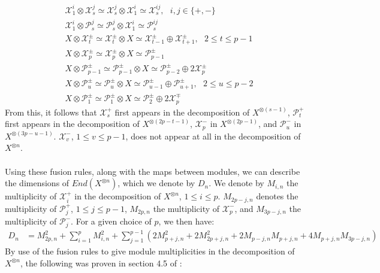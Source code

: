 \documentclass[]{article}
\begin{document}
\begin{align*}
&\mathcal{X}^{i}_{1}\otimes\mathcal{X}^{j}_{s}\simeq\mathcal{X}^{j}_{s}\otimes\mathcal{X}^{i}_{1}\simeq\mathcal{X}^{ij}_{s}, \:\:\: i,j\in\{+,-\}\\
&\mathcal{X}^{i}_{1}\otimes\mathcal{P}^{j}_{s}\simeq\mathcal{P}^{j}_{s}\otimes\mathcal{X}^{i}_{1}\simeq\mathcal{P}^{ij}_{s}\\
& X\otimes\mathcal{X}^{\pm}_{t}\simeq\mathcal{X}^{\pm}_{t}\otimes X\simeq\mathcal{X}^{\pm}_{t-1}\oplus\mathcal{X}^{\pm}_{t+1}, \:\:\: 2\leq t\leq p-1\\
& X\otimes\mathcal{X}^{\pm}_{p}\simeq \mathcal{X}^{\pm}_{p}\otimes X\simeq \mathcal{P}^{\pm}_{p-1}\\
& X\otimes\mathcal{P}^{\pm}_{p-1}\simeq \mathcal{P}^{\pm}_{p-1}\otimes X\simeq \mathcal{P}^{\pm}_{p-2}\oplus 2\mathcal{X}^{\pm}_{p}\\
& X\otimes\mathcal{P}^{\pm}_{u}\simeq\mathcal{P}^{\pm}_{u}\otimes X\simeq\mathcal{P}^{\pm}_{u-1}\oplus\mathcal{P}^{\pm}_{u+1}, \:\:\: 2\leq u\leq p-2\\
& X\otimes\mathcal{P}^{\pm}_{1}\simeq\mathcal{P}^{\pm}_{1}\otimes X\simeq\mathcal{P}^{\pm}_{2}\oplus 2\mathcal{X}^{\mp}_{p}
\end{align*}
From this, it follows that $\mathcal{X}^{+}_{s}$ first appears in the decomposition of $X^{\otimes (s-1)}$, $\mathcal{P}^{+}_{t}$ first appears in the decomposition of $X^{\otimes(2p-t-1)}$, $\mathcal{X}^{-}_{p}$ in $X^{\otimes(2p-1)}$, and $\mathcal{P}^{-}_{u}$ in $X^{\otimes(3p-u-1)}$. $\mathcal{X}^{-}_{v}$, $1\leq v\leq p-1$, does not appear at all in the decomposition of $X^{\otimes n}$.\\
\\
Using these fusion rules, along with the maps between modules, we can describe the dimensions of $End(X^{\otimes n})$, which we denote by $D_{n}$. We denote by $M_{i,n}$ the multiplicity of $\mathcal{X}^{+}_{i}$ in the decomposition of $X^{\otimes n}$, $1\leq i\leq p$. $M_{2p-j,n}$ denotes the multiplicity of $\mathcal{P}^{+}_{j}$, $1\leq j\leq p-1$, $M_{2p,n}$ the multiplicity of $\mathcal{X}^{-}_{p}$, and $M_{3p-j,n}$ the multiplicity of $\mathcal{P}^{-}_{j}$. For a given choice of $p$, we then have:
\begin{align*}
D_{n}&=M_{2p,n}^{2}+\sum\limits_{i=1}^{p}M_{i,n}^{2}+\sum\limits_{j=1}^{p-1}(2M_{p+j,n}^{2}+2M_{2p+j,n}^{2}+2M_{p-j,n}M_{p+j,n}+4M_{p+j,n}M_{3p-j,n})
\end{align*}
By use of the fusion rules to give module multiplicities in the decomposition of $X^{\otimes n}$, the following was proven in section 4.5 of \cite{GST}:
\end{document}
